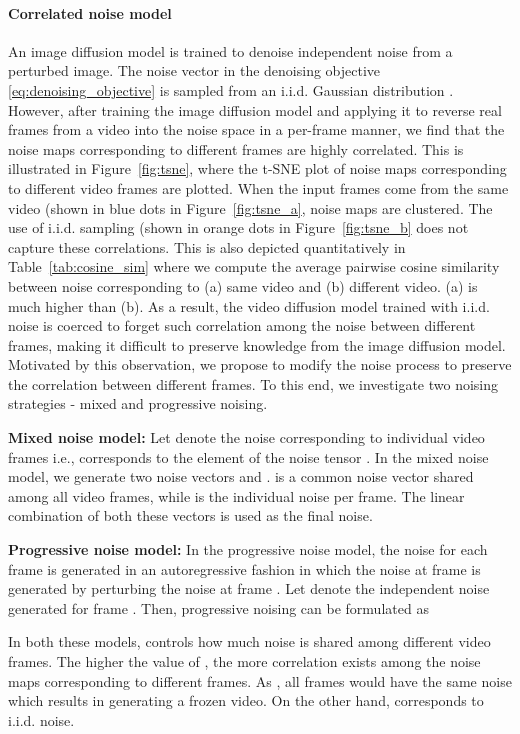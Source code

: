 \documentclass[10pt,twocolumn,letterpaper]{article}
\newcommand{\new}[1]{#1}
\begin{document}
\paragraph{Correlated noise model} 
An image diffusion model is trained to denoise independent noise from a perturbed image. The noise vector  in the denoising objective \eqref{eq:denoising_objective} is sampled from an i.i.d. Gaussian distribution . However, after training the image diffusion model and applying it to reverse real frames from a video into the noise space in a per-frame manner, we find that the noise maps corresponding to different frames are highly correlated. This is illustrated in Figure~\ref{fig:tsne}, where the t-SNE plot of noise maps corresponding to different video frames are plotted. When the input frames come from the same video (shown in blue dots in Figure~\ref{fig:tsne_a}, noise maps are clustered. The use of i.i.d. sampling (shown in orange dots in Figure~\ref{fig:tsne_b} does not capture these correlations. \new{This is also depicted quantitatively in Table~\ref{tab:cosine_sim} where we compute the average pairwise cosine similarity between noise corresponding to (a) same video and (b) different video. (a) is much higher than (b).} As a result, the video diffusion model \new{trained with i.i.d. noise} is coerced to forget such correlation among the noise between different frames, making it difficult to preserve knowledge from the image diffusion model. Motivated by this observation, we propose to modify the noise process to preserve the correlation between different frames. To this end, we investigate two noising strategies - mixed and progressive noising. 


\textbf{Mixed noise model: }
Let  denote the noise corresponding to individual video frames i.e.,  corresponds to the  element of the noise tensor . In the mixed noise model, we generate two noise vectors  and .  is a common noise vector shared among all video frames, while  is the individual noise per frame. The linear combination of both these vectors is used as the final noise.


\textbf{Progressive noise model: }
In the progressive noise model, the noise for each frame is generated in an autoregressive fashion in which the noise at frame  is generated by perturbing the noise at frame . Let  denote the independent noise generated for frame . Then, progressive noising can be formulated as 

In both these models,  controls how much noise is shared among different video frames. The higher the value of , the more correlation exists among the noise maps corresponding to different frames. As , all frames would have the same noise which results in generating a frozen video. 
On the other hand,  corresponds to i.i.d. noise. 
\end{document}
